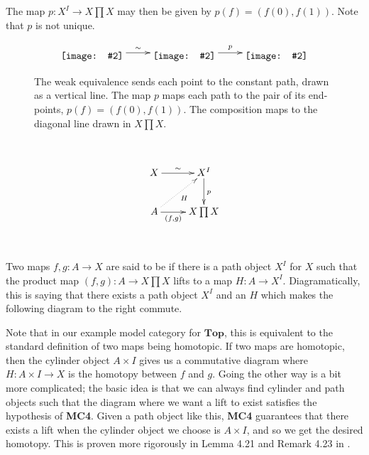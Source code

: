 \documentclass{amsart}
\theoremstyle{definition} \newaliasedtheorem{defn}[thm]{Definition}
\theoremstyle{definition} \newtheorem*{defn*}{Definition}
\theoremstyle{definition} \newaliasedtheorem{xca}[thm]{Exercise}
\theoremstyle{definition} \newtheorem*{soln*}{Solution}
\theoremstyle{definition} \newaliasedtheorem{remark}[thm]{Remark}
\theoremstyle{definition} \newtheorem*{remark*}{Remark}
\newcommand{\defnlabel}[2][]{%
  \ifempty{#1}{%
    \label{defn:#2}\emph{#2}%
  }{%
    \label{defn:#1}\emph{#2}%
  }%
}
\newcommand{\xyincludegraphics}[2][]{\raisebox{-0.5\height}{\texttt{[image: \#2]}}}
\newcommand{\cat}[1]{\ensuremath{\mathbf{#1}}}
\begin{document}
\begin{example}
      The map $p : X^I \to X\prod X$ may then be given by $p(f) = (f(0), f(1))$.  Note that $p$ is not unique.
      
      \begin{figure}[htb]
        \[
        \xymatrix{
          \xyincludegraphics[width=6em]{path_object-X} \ar[r]^-{\sim} & \xyincludegraphics[width=8em]{path_object-X^I} \ar[r]^-p & \xyincludegraphics[width=6em]{path_object-X_x_X}
        }
        \]
        \caption[Path Object Diagram]{The weak equivalence sends each point to the constant path, drawn as a vertical line.  The map $p$ maps each path to the pair of its end-points, $p(f) = (f(0), f(1))$.  %
          The composition maps to the diagonal line drawn in $X \prod X$.} \label{fig:path-object-diagram}
      \end{figure}
    \end{example}
      
      

    $\left.\right.$
    \begin{figure}
      $$
        \xymatrix{
          X \ar[r]^-{\sim} & X^I \ar[d]^p \\
          A \ar[r]_-{(f, g)} \ar@{.>}[ur]_H & X \prod X
        }
      $$
    \end{figure}
    $\left.\right.$

    \begin{defn}
      Two maps $f, g : A \to X$ are said to be \defnlabel{right homotopic} if there is a path object $X^I$ for $X$ such that the product map $(f, g) : A \to X \prod X$ lifts to a map $H : A \to X^I$.  Diagramatically, this is saying that there exists a path object $X^I$ and an $H$ which makes the following diagram to the right commute.
    \end{defn}
    
    Note that in our example model category for \cat{Top}, this is equivalent to the standard definition of two maps being homotopic.  If two maps are homotopic, then the cylinder object $A \times I$ gives us a commutative diagram where $H : A \times I \to X$ is the homotopy between $f$ and $g$.  Going the other way is a bit more complicated; the basic idea is that we can always find cylinder and path objects such that the diagram where we want a lift to exist satisfies the hypothesis of \textbf{MC4}.  Given a path object like this, \textbf{MC4} guarantees that there exists a lift when the cylinder object we choose is $A \times I$, and so we get the desired homotopy.  This is proven more rigorously in Lemma 4.21 and Remark 4.23 in \cite{dwyer1995homotopy}.
\end{document}
